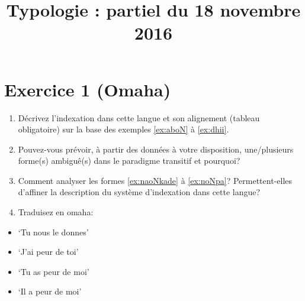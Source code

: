 \documentclass[oldfontcommands,twoside,a4paper,12pt]{article}
\begin{document}
\title{Typologie : partiel du 18 novembre 2016}
\date{}
\maketitle
 

\section*{Exercice 1 (Omaha)}

\begin{enumerate}
\item Décrivez l'indexation dans cette langue et son alignement (tableau obligatoire) sur la base des exemples \ref{ex:aboN} à \ref{ex:dhii}.
\item Pouvez-vous prévoir, à partir des données à votre disposition, une/plusieurs forme(s) ambiguê(s) dans le paradigme transitif et pourquoi?
\item Comment analyser les formes \ref{ex:naoNkade} à \ref{ex:noNpa}? Permettent-elles d'affiner la description du système d'indexation dans cette langue?
\item Traduisez en omaha:
\end{enumerate}
\begin{multicols}{3}
\begin{itemize}
\item `Tu nous le donnes'
\item `J'ai peur de toi'
\item `Tu as peur de moi'
\item `Il a peur de moi'
\end{itemize}
\end{multicols}
\end{document}
